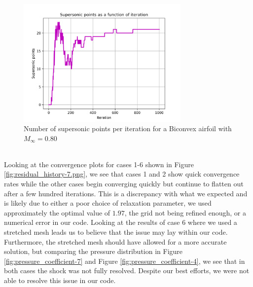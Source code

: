\documentclass[12pt]{article}
\theoremstyle{definition}
\begin{document}
\begin{figure}
    \centering
    \includegraphics[width=0.75\textwidth,height=\textwidth,keepaspectratio]{images/supersonic_points-5.png}
    \caption{Number of supersonic points per iteration for a Biconvex airfoil with $M_\infty = 0.80$}
    \label{fig:supersonic_points-4}
\end{figure}

\vspace{1cm}




\\

Looking at the convergence plots for cases 1-6 shown in Figure \ref{fig:residual_history-7.png}, we see that cases 1 and 2 show quick convergence rates while the other cases begin converging quickly but continue to flatten out after a few hundred iterations. This is a discrepancy with what we expected and is likely due to either a poor choice of relaxation parameter, we used approximately the optimal value of $1.97$, the grid not being refined enough, or a numerical error in our code. Looking at the results of case 6 where we used a stretched mesh leads us to believe that the issue may lay within our code. Furthermore, the stretched mesh should have allowed for a more accurate solution, but comparing the pressure distribution in Figure \ref{fig:pressure_coefficient-7} and Figure \ref{fig:pressure_coefficient-4}, we see that in both cases the shock was not fully resolved. Despite our best efforts, we were not able to resolve this issue in our code.
\end{document}
